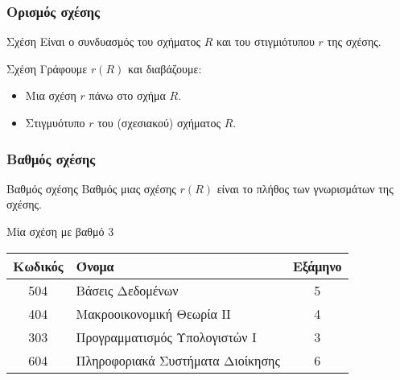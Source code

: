 \begin{frame}
\frametitle{Ορισμός σχέσης}
\begin{minipage}{\wE}
  \begin{block}{Σχέση}
    Είναι ο συνδυασμός του σχήματος $R$ και του στιγμιότυπου $r$ της σχέσης. 
  \end{block}
  \pause
  \begin{exampleblock}{Σχέση}
    Γράφουμε $r(R)$ και διαβάζουμε:\\
    \begin{itemize}
      \item Μια σχέση $r$ πάνω στο σχήμα $R$.
      \item Στιγμυότυπο $r$ του (σχεσιακού) σχήματος $R$.
    \end{itemize}

  \end{exampleblock}
\end{minipage}
\end{frame}


\begin{frame}
\frametitle{Βαθμός σχέσης}
\begin{minipage}{\wE}
  \begin{block}{Βαθμός σχέσης}
    Βαθμός μιας σχέσης $r(R)$ είναι το πλήθος των γνωρισμάτων της σχέσης.
  \end{block}
  \pause
  \begin{exampleblock}{Μία σχέση με βαθμό 3}
    \begin{tabular}{ c l c } \toprule
        {\bf Κωδικός} & {\bf Όνομα} & {\bf Εξάμηνο} \\ \midrule
        504 & Βάσεις Δεδομένων & 5 \\
        404 & Μακροοικονομική Θεωρία ΙΙ & 4 \\
        303 & Προγραμματισμός Υπολογιστών Ι & 3 \\
        604 & Πληροφοριακά Συστήματα Διοίκησης & 6 \\ \bottomrule
    \end{tabular}    
  \end{exampleblock}
\end{minipage}  
\end{frame}


